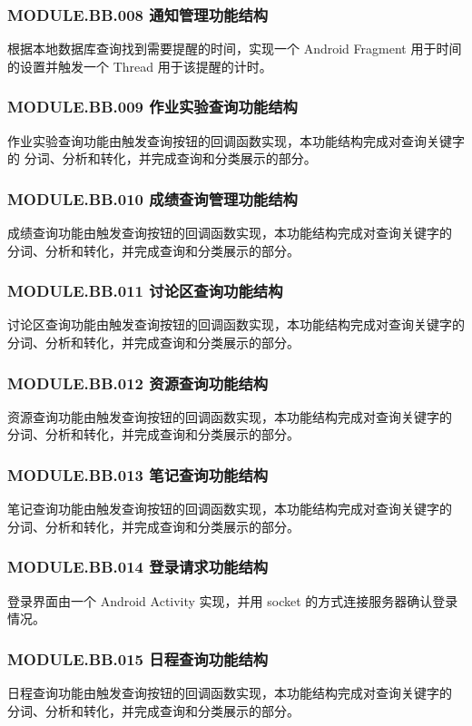 \subsubsection{MODULE.BB.008    通知管理功能结构}
根据本地数据库查询找到需要提醒的时间，实现一个 Android Fragment 用于时间的设置并触发一个 Thread 用于该提醒的计时。

\subsubsection{MODULE.BB.009    作业实验查询功能结构}
作业实验查询功能由触发查询按钮的回调函数实现，本功能结构完成对查询关键字的 分词、分析和转化，并完成查询和分类展示的部分。

\subsubsection{MODULE.BB.010    成绩查询管理功能结构}
成绩查询功能由触发查询按钮的回调函数实现，本功能结构完成对查询关键字的 分词、分析和转化，并完成查询和分类展示的部分。

\subsubsection{MODULE.BB.011    讨论区查询功能结构}
讨论区查询功能由触发查询按钮的回调函数实现，本功能结构完成对查询关键字的 分词、分析和转化，并完成查询和分类展示的部分。

\subsubsection{MODULE.BB.012    资源查询功能结构}
资源查询功能由触发查询按钮的回调函数实现，本功能结构完成对查询关键字的 分词、分析和转化，并完成查询和分类展示的部分。

\subsubsection{MODULE.BB.013    笔记查询功能结构}
笔记查询功能由触发查询按钮的回调函数实现，本功能结构完成对查询关键字的 分词、分析和转化，并完成查询和分类展示的部分。

\subsubsection{MODULE.BB.014    登录请求功能结构}
登录界面由一个 Android Activity 实现，并用 socket 的方式连接服务器确认登录情况。

\subsubsection{MODULE.BB.015    日程查询功能结构}
日程查询功能由触发查询按钮的回调函数实现，本功能结构完成对查询关键字的 分词、分析和转化，并完成查询和分类展示的部分。

